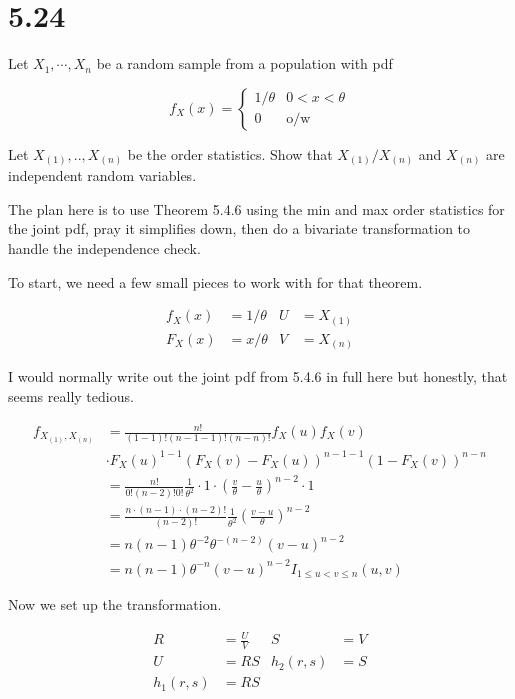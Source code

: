 \section*{5.24}

Let $X_1,\cdots, X_n$ be a random sample from a population with pdf

\[
	f_X(x) =
	\begin{cases}
		1/\theta & 0<x<\theta \\
		0 & \text{o/w}
	\end{cases}
\]

Let $X_{(1)},..,X_{(n)}$ be the order statistics. Show that $X_{(1)}/X_{(n)}$ and $X_{(n)}$ are independent random variables.

The plan here is to use Theorem 5.4.6 using the min and max order statistics for the joint pdf, pray it simplifies down, then do a bivariate transformation to handle the independence check.

To start, we need a few small pieces to work with for that theorem.

\begin{align*}
	f_X(x) &= 1/\theta & U&=X_{(1)} \\
	F_X(x) &= x/\theta & V&=X_{(n)}
\end{align*}

I would normally write out the joint pdf from 5.4.6 in full here but honestly, that seems really tedious.

\begin{align*}
	f_{X_{(1)}, X_{(n)}} &= \frac{n!}{(1-1)!(n-1-1)!(n-n)!} f_X(u)f_X(v) \\
	&\cdot F_X(u)^{1-1}\left( F_X(v) - F_X(u) \right)^{n-1-1} (1-F_X(v))^{n-n} \\
	&= \frac{n!}{0!(n-2)!0!} \frac{1}{\theta^2} \cdot 1 \cdot \left( \frac{v}{\theta} - \frac{u}{\theta} \right)^{n-2} \cdot 1 \\
	&= \frac{n \cdot (n-1) \cdot (n-2)!}{(n-2)!} \frac{1}{\theta^2} \left( \frac{v-u}{\theta} \right)^{n-2} \\
	&= n(n-1)\theta^{-2}\theta^{-(n-2)}(v-u)^{n-2} \\
	&= n(n-1)\theta^{-n}(v-u)^{n-2}I_{1\leq u < v \leq n}(u,v)
\end{align*}

Now we set up the transformation. 

\vspace{-4mm}
\begin{align*}
	R &= \frac{U}{V} & S &= V \\
	U &= RS & h_2(r,s) &= S \\
	h_1(r,s) &= RS
\end{align*}

